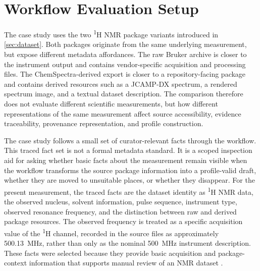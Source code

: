 \section{Workflow Evaluation Setup}
\label{sec:evaluation-setup}

The case study uses the two \textsuperscript{1}H \ac{NMR} package variants introduced in \cref{sec:dataset}.
Both packages originate from the same underlying measurement, but expose different metadata affordances.
The raw Bruker archive is closer to the instrument output and contains vendor-specific acquisition and processing files.
The ChemSpectra-derived export is closer to a repository-facing package and contains derived resources such as a \ac{JCAMP-DX} spectrum, a rendered spectrum image, and a textual dataset description.
The comparison therefore does not evaluate different scientific measurements, but how different representations of the same measurement affect source accessibility, evidence traceability, provenance representation, and profile construction.

The case study follows a small set of curator-relevant facts through the workflow.
This traced fact set is not a formal metadata standard.
It is a scoped inspection aid for asking whether basic facts about the measurement remain visible when the workflow transforms the source package information into a profile-valid draft, whether they are moved to unsuitable places, or whether they disappear.
For the present measurement, the traced facts are the dataset identity as \textsuperscript{1}H \ac{NMR} data, the observed nucleus, solvent information, pulse sequence, instrument type, observed resonance frequency, and the distinction between raw and derived package resources.
The observed frequency is treated as a specific acquisition value of the \textsuperscript{1}H channel, recorded in the source files as approximately 500.13~MHz, rather than only as the nominal 500~MHz instrument description.
These facts were selected because they provide basic acquisition and package-context information that supports manual review of an \ac{NMR} dataset \cite{Schober2018nmrML}.

